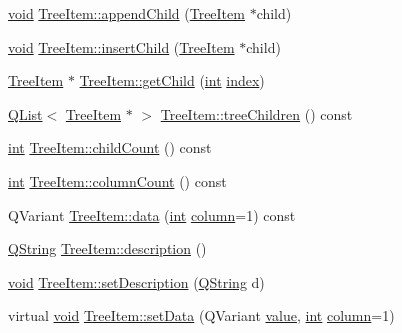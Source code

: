 \begin{DoxyCompactItemize}
\hyperlink{group___u_a_v_objects_plugin_ga444cf2ff3f0ecbe028adce838d373f5c}{void} \hyperlink{group___u_a_v_object_browser_plugin_gac7f432ac0587ca037e80857eefd622f8}{Tree\-Item\-::append\-Child} (\hyperlink{class_tree_item}{Tree\-Item} $\ast$child)
\item 
\hyperlink{group___u_a_v_objects_plugin_ga444cf2ff3f0ecbe028adce838d373f5c}{void} \hyperlink{group___u_a_v_object_browser_plugin_ga1d0b952f15a93167dadb41667ccc5e4c}{Tree\-Item\-::insert\-Child} (\hyperlink{class_tree_item}{Tree\-Item} $\ast$child)
\item 
\hyperlink{class_tree_item}{Tree\-Item} $\ast$ \hyperlink{group___u_a_v_object_browser_plugin_gae115cb3e046c94117d64ee87764cb3ef}{Tree\-Item\-::get\-Child} (\hyperlink{ioapi_8h_a787fa3cf048117ba7123753c1e74fcd6}{int} \hyperlink{glext_8h_ab47dd9958bcadea08866b42bf358e95e}{index})
\item 
\hyperlink{class_q_list}{Q\-List}$<$ \hyperlink{class_tree_item}{Tree\-Item} $\ast$ $>$ \hyperlink{group___u_a_v_object_browser_plugin_gaa56dc80d617c2c9bd914abe5da774fd8}{Tree\-Item\-::tree\-Children} () const 
\item 
\hyperlink{ioapi_8h_a787fa3cf048117ba7123753c1e74fcd6}{int} \hyperlink{group___u_a_v_object_browser_plugin_ga55ffe6dd27750e479034b93e753f87af}{Tree\-Item\-::child\-Count} () const 
\item 
\hyperlink{ioapi_8h_a787fa3cf048117ba7123753c1e74fcd6}{int} \hyperlink{group___u_a_v_object_browser_plugin_ga31c3fb89ad8e19ae696a310a1f843a8e}{Tree\-Item\-::column\-Count} () const 
\item 
Q\-Variant \hyperlink{group___u_a_v_object_browser_plugin_ga7c5708ae3cbba9c509f497c493beccb6}{Tree\-Item\-::data} (\hyperlink{ioapi_8h_a787fa3cf048117ba7123753c1e74fcd6}{int} \hyperlink{glext_8h_a3b58c39b1b7ca6f4012b27e84de3bdb3}{column}=1) const 
\item 
\hyperlink{group___u_a_v_objects_plugin_gab9d252f49c333c94a72f97ce3105a32d}{Q\-String} \hyperlink{group___u_a_v_object_browser_plugin_gadb051f76eb10bd51ba2b7830601f0046}{Tree\-Item\-::description} ()
\item 
\hyperlink{group___u_a_v_objects_plugin_ga444cf2ff3f0ecbe028adce838d373f5c}{void} \hyperlink{group___u_a_v_object_browser_plugin_ga14cc339bd1ed2fc44cb352461c623031}{Tree\-Item\-::set\-Description} (\hyperlink{group___u_a_v_objects_plugin_gab9d252f49c333c94a72f97ce3105a32d}{Q\-String} d)
\item 
virtual \hyperlink{group___u_a_v_objects_plugin_ga444cf2ff3f0ecbe028adce838d373f5c}{void} \hyperlink{group___u_a_v_object_browser_plugin_gac71bc85379e761548f4a7d15f049cdd8}{Tree\-Item\-::set\-Data} (Q\-Variant \hyperlink{glext_8h_aa0e2e9cea7f208d28acda0480144beb0}{value}, \hyperlink{ioapi_8h_a787fa3cf048117ba7123753c1e74fcd6}{int} \hyperlink{glext_8h_a3b58c39b1b7ca6f4012b27e84de3bdb3}{column}=1)

\end{DoxyCompactItemize}

